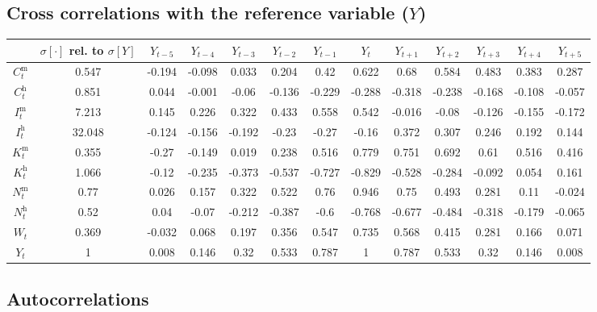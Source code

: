 \subsection{Cross correlations with the reference variable ($Y$)}

\begin{tabular}{c|c|c|c|c|c|c|c|c|c|c|c|c|}
  & $\sigma[\cdot]$ rel. to $\sigma[Y]$ & $Y_{t-5}$ & $Y_{t-4}$ & $Y_{t-3}$ & $Y_{t-2}$ & $Y_{t-1}$ & $Y_{t}$ & $Y_{t+1}$ & $Y_{t+2}$ & $Y_{t+3}$ & $Y_{t+4}$ & $Y_{t+5}$\\
\hline
$C^{\mathrm{m}}_{t}$ & 0.547 & -0.194 & -0.098 & 0.033 & 0.204 & 0.42 & 0.622 & 0.68 & 0.584 & 0.483 & 0.383 & 0.287 \\
$C^{\mathrm{h}}_{t}$ & 0.851 & 0.044 & -0.001 & -0.06 & -0.136 & -0.229 & -0.288 & -0.318 & -0.238 & -0.168 & -0.108 & -0.057 \\
$I^{\mathrm{m}}_{t}$ & 7.213 & 0.145 & 0.226 & 0.322 & 0.433 & 0.558 & 0.542 & -0.016 & -0.08 & -0.126 & -0.155 & -0.172 \\
$I^{\mathrm{h}}_{t}$ & 32.048 & -0.124 & -0.156 & -0.192 & -0.23 & -0.27 & -0.16 & 0.372 & 0.307 & 0.246 & 0.192 & 0.144 \\
$K^{\mathrm{m}}_{t}$ & 0.355 & -0.27 & -0.149 & 0.019 & 0.238 & 0.516 & 0.779 & 0.751 & 0.692 & 0.61 & 0.516 & 0.416 \\
$K^{\mathrm{h}}_{t}$ & 1.066 & -0.12 & -0.235 & -0.373 & -0.537 & -0.727 & -0.829 & -0.528 & -0.284 & -0.092 & 0.054 & 0.161 \\
$N^{\mathrm{m}}_{t}$ & 0.77 & 0.026 & 0.157 & 0.322 & 0.522 & 0.76 & 0.946 & 0.75 & 0.493 & 0.281 & 0.11 & -0.024 \\
$N^{\mathrm{h}}_{t}$ & 0.52 & 0.04 & -0.07 & -0.212 & -0.387 & -0.6 & -0.768 & -0.677 & -0.484 & -0.318 & -0.179 & -0.065 \\
$W_{t}$ & 0.369 & -0.032 & 0.068 & 0.197 & 0.356 & 0.547 & 0.735 & 0.568 & 0.415 & 0.281 & 0.166 & 0.071 \\
$Y_{t}$ & 1 & 0.008 & 0.146 & 0.32 & 0.533 & 0.787 & 1 & 0.787 & 0.533 & 0.32 & 0.146 & 0.008 \\
\hline
\end{tabular}


\subsection{Autocorrelations}

